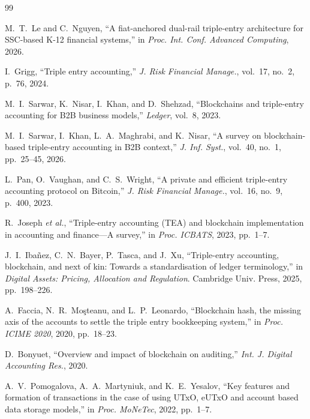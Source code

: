 \documentclass[journal]{IEEEtran}
\begin{document}
\begin{thebibliography}{99}

M.~T.~Le and C.~Nguyen, ``A fiat-anchored dual-rail triple-entry architecture for SSC-based K-12 financial systems,'' in \emph{Proc. Int. Conf. Advanced Computing}, 2026.

I.~Grigg, ``Triple entry accounting,'' \emph{J. Risk Financial Manage.}, vol.~17, no.~2, p.~76, 2024.

M.~I.~Sarwar, K.~Nisar, I.~Khan, and D.~Shehzad, ``Blockchains and triple-entry accounting for B2B business models,'' \emph{Ledger}, vol.~8, 2023.

M.~I.~Sarwar, I.~Khan, L.~A.~Maghrabi, and K.~Nisar, ``A survey on blockchain-based triple-entry accounting in B2B context,'' \emph{J. Inf. Syst.}, vol.~40, no.~1, pp.~25--45, 2026.

L.~Pan, O.~Vaughan, and C.~S.~Wright, ``A private and efficient triple-entry accounting protocol on Bitcoin,'' \emph{J. Risk Financial Manage.}, vol.~16, no.~9, p.~400, 2023.

R.~Joseph \emph{et al.}, ``Triple-entry accounting (TEA) and blockchain implementation in accounting and finance---A survey,'' in \emph{Proc. ICBATS}, 2023, pp.~1--7.

J.~I.~Iba\~{n}ez, C.~N.~Bayer, P.~Tasca, and J.~Xu, ``Triple-entry accounting, blockchain, and next of kin: Towards a standardisation of ledger terminology,'' in \emph{Digital Assets: Pricing, Allocation and Regulation}. Cambridge Univ. Press, 2025, pp.~198--226.

A.~Faccia, N.~R.~Mo\c{s}teanu, and L.~P.~Leonardo, ``Blockchain hash, the missing axis of the accounts to settle the triple entry bookkeeping system,'' in \emph{Proc. ICIME 2020}, 2020, pp.~18--23.

D.~Bonyuet, ``Overview and impact of blockchain on auditing,'' \emph{Int. J. Digital Accounting Res.}, 2020.

A.~V.~Pomogalova, A.~A.~Martyniuk, and K.~E.~Yesalov, ``Key features and formation of transactions in the case of using UTxO, eUTxO and account based data storage models,'' in \emph{Proc. MoNeTec}, 2022, pp.~1--7.


\end{thebibliography}
\end{document}
